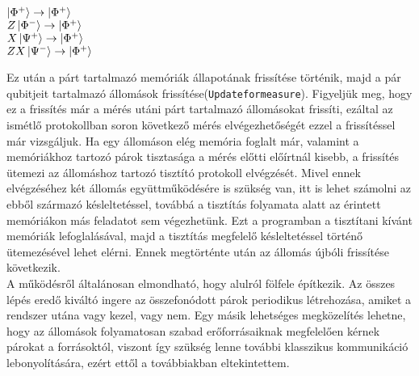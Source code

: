 \begin{center}
$\ket{\Phi^+} \rightarrow \ket{\Phi^+}$ \\
$Z\ket{\Phi^-} \rightarrow \ket{\Phi^+}$ \\
$X\ket{\Psi^+} \rightarrow \ket{\Phi^+}$ \\
$ZX\ket{\Psi^-} \rightarrow \ket{\Phi^+}$ \\
\end{center}
Ez után a párt tartalmazó memóriák állapotának frissítése történik, majd a pár qubitjeit tartalmazó állomások frissítése(\texttt{Updateformeasure}). Figyeljük meg, hogy ez a frissítés már a mérés utáni párt tartalmazó állomásokat frissíti, ezáltal az ismétlő protokollban soron következő mérés elvégezhetőségét ezzel a frissítéssel már vizsgáljuk.
Ha egy állomáson elég memória foglalt már, valamint a memóriákhoz tartozó párok tisztasága a mérés előtti előírtnál kisebb, a frissítés ütemezi az állomáshoz tartozó tisztító protokoll elvégzését. Mivel ennek elvégzéséhez két állomás együttműködésére is szükség van, itt is lehet számolni az ebből származó késleltetéssel, továbbá a tisztítás folyamata alatt az érintett memóriákon más feladatot sem végezhetünk. Ezt a programban a tisztítani kívánt memóriák lefoglalásával, majd a tisztítás megfelelő késleltetéssel történő ütemezésével lehet elérni. Ennek megtörténte után az állomás újbóli frissítése következik. \\
A működésről általánosan elmondható, hogy alulról fölfele építkezik. Az összes lépés eredő kiváltó ingere az összefonódott párok periodikus létrehozása, amiket a rendszer utána vagy kezel, vagy nem. Egy másik lehetséges megközelítés lehetne, hogy az állomások folyamatosan szabad erőforrásaiknak megfelelően kérnek párokat a forrásoktól, viszont így szükség lenne további klasszikus kommunikáció lebonyolítására, ezért ettől a továbbiakban eltekintettem.

